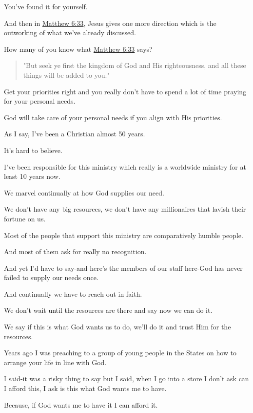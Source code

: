\documentclass[11pt]{article}
\begin{document}
You've found it for yourself.

And then in \href{https://www.biblegateway.com/passage/?search=Matthew\%206\%3A33\&version=ESV}{Matthew 6:33}, Jesus gives one more
direction which is the outworking of what
we've already discussed.

How many of you know what \href{https://www.biblegateway.com/passage/?search=Matthew\%206\%3A33\&version=ESV}{Matthew 6:33} says?

\begin{quote}
"But seek ye first the kingdom of God and His
righteousness, and all these things will be
added to you."
\end{quote}

Get your priorities right and
you really don't have to spend a lot of time
praying for your personal needs.

God will take care of your personal needs if
you align with His priorities.

As I say, I've been a Christian almost 50
years.

It's hard to believe.

I've been responsible for this ministry which
really is a worldwide ministry for at least 10
years now.

We marvel continually at how God supplies our
need.

We don't have any big resources, we don't have
any millionaires that lavish their fortune on
us.

Most of the people that support this ministry
are comparatively humble people.

And most of them ask for really no
recognition.

And yet I'd have to say-and here's the members
of our staff here-God has never failed to
supply our needs once.

And continually we have to reach out in faith.

We don't wait until the resources are there
and say now we can do it.

We say if this is what God wants us to do,
we'll do it and trust Him for the resources.

Years ago I was preaching to a group of young
people in the States on how to arrange your
life in line with God.

I said-it was a risky thing to say but I said,
when I go into a store I don't ask can I
afford this, I ask is this what God wants me
to have.

Because, if God wants me to have it I can
afford it.
\end{document}
